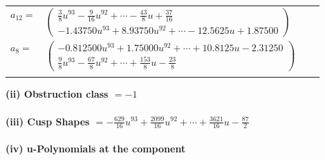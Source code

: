 \documentclass[1p]{elsarticle_modified}
\theoremstyle{definition}
\begin{document}
\begin{tabular}{m{7pt} m{180pt} m{7pt} m{180pt} }
\flushright $a_{12}=$&$\begin{pmatrix}\frac{3}{8} u^{93}-\frac{9}{16} u^{92}+\cdots-\frac{43}{8} u+\frac{37}{16}\\-1.43750 u^{93}+8.93750 u^{92}+\cdots-12.5625 u+1.87500\end{pmatrix}$ \\
\flushright $a_{8}=$&$\begin{pmatrix}-0.812500 u^{93}+1.75000 u^{92}+\cdots+10.8125 u-2.31250\\\frac{9}{8} u^{93}-\frac{67}{8} u^{92}+\cdots+\frac{153}{8} u-\frac{23}{8}\end{pmatrix}$\\&\end{tabular}
\flushleft \textbf{(ii) Obstruction class $= -1$}\\~\\
\flushleft \textbf{(iii) Cusp Shapes $= -\frac{629}{16} u^{93}+\frac{2099}{16} u^{92}+\cdots+\frac{3621}{16} u-\frac{87}{2}$}\\~\\
\newpage\renewcommand{\arraystretch}{1}
\flushleft \textbf{(iv) u-Polynomials at the component}\newline \\
\end{document}
